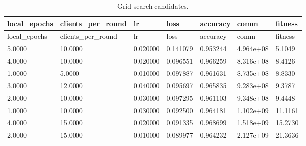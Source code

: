 \documentclass[11pt]{report}
\begin{document}
\begin{longtable}{lllllll}
\caption{Grid-search candidates.}\\
\toprule
local\_epochs & clients\_per\_round & lr & loss & accuracy & comm & fitness \\
\midrule
\endfirsthead
\toprule
local\_epochs & clients\_per\_round & lr & loss & accuracy & comm & fitness \\
\midrule
\endhead
5.0000 & 10.0000 & 0.020000 & 0.141079 & 0.953244 & 4.964e+08 & 5.1049 \\
4.0000 & 10.0000 & 0.020000 & 0.096551 & 0.966259 & 8.316e+08 & 8.4126 \\
1.0000 & 5.0000 & 0.010000 & 0.097887 & 0.961631 & 8.735e+08 & 8.8330 \\
3.0000 & 12.0000 & 0.040000 & 0.095697 & 0.965835 & 9.283e+08 & 9.3787 \\
2.0000 & 10.0000 & 0.030000 & 0.097295 & 0.961103 & 9.348e+08 & 9.4448 \\
1.0000 & 10.0000 & 0.030000 & 0.092500 & 0.964181 & 1.102e+09 & 11.1161 \\
4.0000 & 15.0000 & 0.020000 & 0.091335 & 0.968699 & 1.518e+09 & 15.2730 \\
2.0000 & 15.0000 & 0.010000 & 0.089977 & 0.964232 & 2.127e+09 & 21.3636 \\
\bottomrule
\end{longtable}
\end{document}
